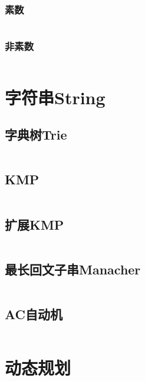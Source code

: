 \documentclass[twoside,sub3section,UTF8]{ctexart}						%
\begin{document}
		\subsubsection{素数}
		\inputminted{c++}{"Maths/CRT(prime).cpp"}
		\subsubsection{非素数}
		\inputminted{c++}{"Maths/CRT(notprime).cpp"}
 
\section{字符串String}
	\subsection{字典树Trie}
	\inputminted{c++}{"String/Trie.cpp"}
	\subsection{KMP}
	\inputminted{c++}{"String/KMP.cpp"}
	\subsection{扩展KMP}
	\inputminted{c++}{"String/EXKMP.cpp"}
	\subsection{最长回文子串Manacher}
	\inputminted{c++}{"String/Manacher.cpp"}
	\subsection{AC自动机}
	\inputminted{c++}{"String/AC.cpp"}
	
\section{动态规划}
\end{document}
